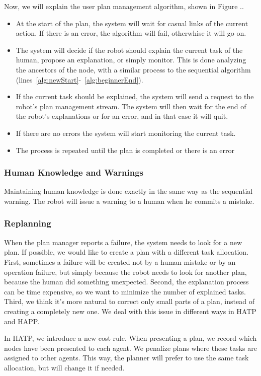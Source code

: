 Now, we will explain the user plan management algorithm, shown in Figure ..
\begin{itemize}
\item At the start of the plan, the system will wait for casual links of the current action. If there is an error, the algorithm will fail, otherwhise it will go on.
\item The system will decide if the robot should explain the current task of the human, propose an explanation, or simply monitor. This is done analyzing the ancestors of the node, with a similar process to the sequential algorithm (lines~\ref{alg:newStart}-~\ref{alg:beginnerEnd}).
\item If the current task should be explained, the system will send a request to the robot's plan management stream. The system will then wait for the end of the robot's explanations or for an error, and in that case it will quit.
\item If there are no errors the system will start monitoring the current task.
\item The process is repeated until the plan is completed or there is an error
\end{itemize}

\subsubsection{Human Knowledge and Warnings}
Maintaining human knowledge is done exactly in the same way as the sequential warning. The robot will issue a warning to a human when he commits a mistake.

\subsubsection{Replanning}
When the plan manager reports a failure, the system needs to look for a new plan. If possible, we would like to create a plan with a different task allocation. First, sometimes a failure will be created not by a human mistake or by an operation failure, but simply because the robot needs to look for another plan, because the human did something unexpected. Second, the explanation process can be time expensive, so we want to minimize the number of explained tasks. Third, we think it's more natural to correct only small parts of a plan, instead of creating a completely new one. We deal with this issue in different ways in HATP and HAPP.

In HATP, we introduce a new cost rule. When presenting a plan, we record which nodes have been presented to each agent. We penalize plans where these tasks are assigned to other agents. This way, the planner will prefer to use the same task allocation, but will change it if needed.


